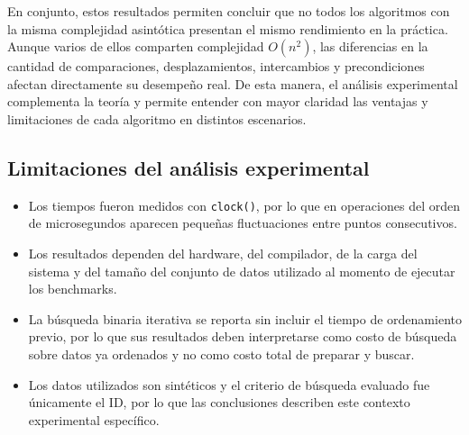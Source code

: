 En conjunto, estos resultados permiten concluir que no todos los algoritmos con la misma complejidad asintótica presentan el mismo rendimiento en la práctica. Aunque varios de ellos comparten complejidad \(O(n^2)\), las diferencias en la cantidad de comparaciones, desplazamientos, intercambios y precondiciones afectan directamente su desempeño real. De esta manera, el análisis experimental complementa la teoría y permite entender con mayor claridad las ventajas y limitaciones de cada algoritmo en distintos escenarios.

\subsection{Limitaciones del análisis experimental}
\begin{itemize}
    \item Los tiempos fueron medidos con \texttt{clock()}, por lo que en operaciones del orden de microsegundos aparecen pequeñas fluctuaciones entre puntos consecutivos.
    \item Los resultados dependen del hardware, del compilador, de la carga del sistema y del tamaño del conjunto de datos utilizado al momento de ejecutar los benchmarks.
    \item La búsqueda binaria iterativa se reporta sin incluir el tiempo de ordenamiento previo, por lo que sus resultados deben interpretarse como costo de búsqueda sobre datos ya ordenados y no como costo total de preparar y buscar.
    \item Los datos utilizados son sintéticos y el criterio de búsqueda evaluado fue únicamente el ID, por lo que las conclusiones describen este contexto experimental específico.
    \end{itemize}
